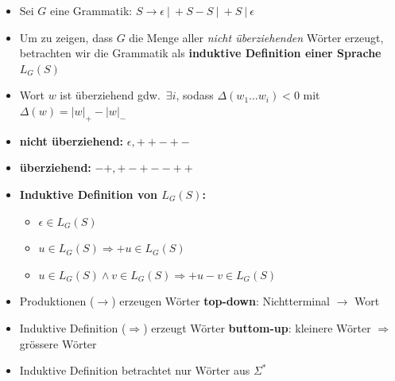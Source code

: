 \documentclass[ieeetran]{article}
\begin{document}
\begin{itemize}
  \item Sei $G$ eine Grammatik: $S \rightarrow \epsilon \ | \ +S-S \ | \ +S \ | \ \epsilon$ 
\item Um zu zeigen, dass $G$ die Menge aller \textit{nicht überziehenden} Wörter erzeugt, betrachten wir die Grammatik als \textbf{induktive Definition einer Sprache $L_G(S)$}

\item Wort $w$ ist überziehend gdw.\ $\exists i$, sodass $\Delta (w_1 \ldots w_i) < 0$ mit $\Delta(w) = |w|_+ - |w|_-$

\item \textbf{nicht überziehend:} $\epsilon, ++-+-$
\item \textbf{überziehend:} $-+, +-+--++$
\item \textbf{Induktive Definition von $L_G(S)$:}
\begin{itemize}
  \item $\epsilon \in L_G(S)$
  \item $u \in L_G(S) \Longrightarrow +u \in L_G(S)$
\item $u \in L_G(S) \land v \in L_G(S) \Longrightarrow +u-v \in L_G(S)$
\end{itemize}	

\item Produktionen ($\rightarrow$) erzeugen Wörter \textbf{top-down}: Nichtterminal $\rightarrow$ Wort
\item Induktive Definition ($\Longrightarrow$) erzeugt Wörter \textbf{buttom-up}: kleinere Wörter $\Longrightarrow$ grössere Wörter
\item Induktive Definition betrachtet nur Wörter aus $\Sigma^*$

\end{itemize}

\pagebreak
\end{document}
